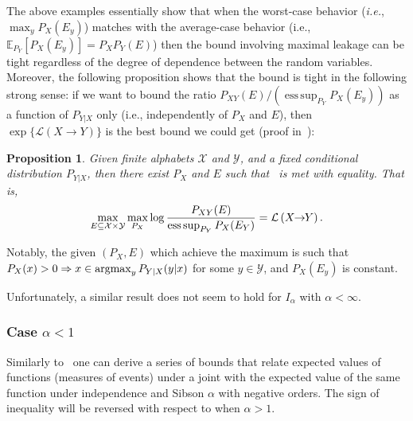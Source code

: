 \documentclass{article}
\numberwithin{theorem}{section}
\numberwithin{example}{section}
\numberwithin{remark}{section}
\numberwithin{definition}{section}
\newtheorem{proposition}[theorem]{Proposition}
\DeclareMathOperator*{\esssup}{ess\,sup}
\newcommand{\X}{\mathcal{X}}
\newcommand{\Y}{\mathcal{Y}}
\newcommand{\ml}[2]{\mathcal{L}\left(#1  \!\!  \to  \!\!   #2\right)} %
\newcommand{\argmax}{\operatornamewithlimits{argmax}}
\newcommand{\revised}[1]{{\color{black} #1}}
\begin{document}
The above examples essentially show that when the worst-case behavior (\textit{i.e.}, $\max_yP_X(E_y)$) matches with the average-case behavior (i.e., $\mathbb{E}_{P_Y}[P_X(E_y)]=P_XP_Y(E)$) then the bound involving maximal leakage can be tight regardless of the degree of dependence between the random variables.
Moreover, the following proposition shows that the bound is tight in the following strong sense: if we want to bound the ratio $P_{XY}(E)/(\esssup_{P_Y} P_X(E_y))$ as a function of $P_{Y|X}$ only (i.e., independently of $P_X$ and $E$), then $\exp \{ \ml{X}{Y} \}$ is the best bound we could get (proof in~):


\begin{proposition} \label{prop:MLboundtightness}
Given finite alphabets $\X$ and $\Y$, and a  fixed conditional distribution $P_{Y|X}$, then there exist $P_X$ and $E$ such that~ is met with equality. That is,
\begin{align}
\label{eq:MLboundtightness}
\revised{\max_{ E \subseteq \X \times \Y}  \max_{P_X}} \log \frac{P_{XY}(E)}{\esssup_{P_Y} P_X(E_Y) } = \ml{X}{Y}.
\end{align}
\end{proposition}

\revised{Notably, the given $(P_X,E)$ which achieve the maximum is such that $P_X(x) > 0 \Rightarrow x \in \argmax_y P_{Y|X}(y|x)$ for some $y \in \Y$, and $P_X(E_y)$ is constant.}

Unfortunately, a similar result does not seem to hold for $I_\alpha$ with $\alpha<\infty$.  
\subsubsection{Case $\alpha<1$}\label{sec:depVsIndepNeg}
Similarly to~ one can derive a series of bounds that relate expected values of functions (measures of events) under a joint with the expected value of the same function under independence and Sibson $\alpha$ with negative orders. The sign of inequality will be reversed with respect to when $\alpha>1$. %
\end{document}
